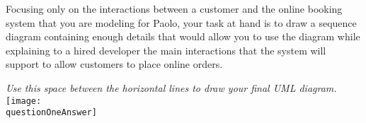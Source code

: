 Focusing only on the interactions between a customer and the online booking system that you are modeling for Paolo, your task at hand is to draw a sequence diagram containing enough details that would allow you to use the diagram while explaining to a hired developer the main interactions that the system will support to allow customers to place online orders.

\newpage
\fullline\vspace{-8pt}
\begin{center}{
	\scriptsize{\emph{Use this space between the horizontal lines to draw your final UML diagram.}}
	\texttt{[image: \\questionOneAnswer]}
	}
\end{center}
\vfill
\fullline




